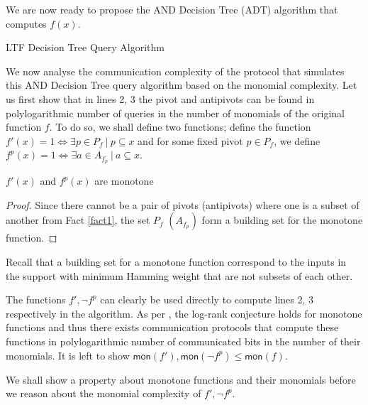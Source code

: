 We are now ready to propose the \textsf{AND} Decision Tree (ADT) algorithm that computes $f(x)$. 

\begin{algorithm}[H]\label{alg1}
\caption{LTF Decision Tree Query Algorithm}
\end{algorithm}


We now analyse the communication complexity of the protocol that simulates this \textsf{AND} Decision Tree query algorithm based on the monomial complexity. Let us first show that in lines 2, 3 the pivot and antipivots can be found in polylogarithmic number of queries in the number of monomials of the original function $f$. To do so, we shall define two functions; define the function $f'(x) = 1 \iff \exists p \in P_f \ | \ p \subseteq x$ and for some fixed pivot $p \in P_f$, we define $f^p(x) = 1 \iff \exists a \in A_{f_p} \ | \ a \subseteq x$.  


\begin{proposition}\label{prop1}
	$f'(x)$ and $f^p(x)$ are monotone 
	\begin{proof}
		Since there cannot be a pair of pivots (antipivots) where one is a subset of another from Fact \ref{fact1}, the set $P_f$ $(A_{f_p})$ form a building set for the monotone function. 
	\end{proof}
\end{proposition}

Recall that a building set for a monotone function correspond to the inputs in the support with minimum Hamming weight that are not subsets of each other.

The functions $f', \neg f^p$ can clearly be used directly to compute lines 2, 3 respectively in the algorithm. As per \cite{Buhrman1999,Lovasz1993}, the log-rank conjecture holds for monotone functions and thus there exists communication protocols that compute these functions in polylogarithmic number of communicated bits in the number of their monomials. It is left to show $\mathsf{mon}(f'), \mathsf{mon}( \neg f^p) \leq \mathsf{mon}(f)$.

We shall show a property about monotone functions and their monomials before we reason about the monomial complexity of $f', \neg f^p$.

